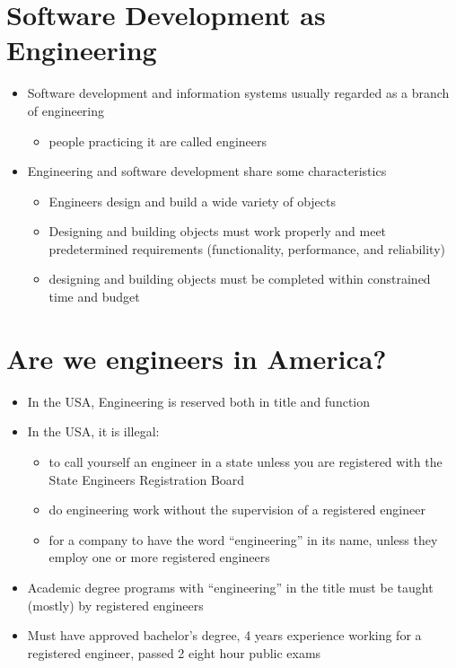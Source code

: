 \documentclass{article}
\begin{document}
\section{Software Development as Engineering}
\begin{itemize}
\item Software development and information systems usually regarded as a branch of engineering
\begin{itemize}
\item people practicing it are called engineers
\end{itemize}
\item Engineering and software development share some characteristics
\begin{itemize}
\item Engineers design and build a wide variety of objects
\item Designing and building objects must work properly and meet predetermined requirements (functionality, performance, and reliability)
\item designing and building objects must be completed within constrained time and budget
\end{itemize}
\end{itemize}



\section{Are we engineers in America?}
\begin{itemize}
\item In the USA, Engineering is reserved both in title and function
\item In the USA, it is illegal: 
\begin{itemize}
\item to call yourself an engineer in a state unless you are registered with the State Engineers Registration Board
\item do engineering work without the supervision of a registered engineer
\item for a company to have the word ``engineering'' in its name, unless they employ one or more registered engineers
\end{itemize}
\item Academic degree programs with ``engineering'' in the title must be taught (mostly) by registered engineers
\item Must have approved bachelor's degree, 4 years experience working for a registered engineer, passed 2 eight hour public exams
\end{itemize}
\end{document}
